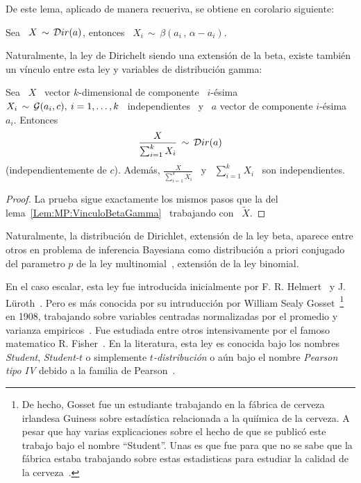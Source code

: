 De este lema, aplicado de manera recueriva, se obtiene en corolario siguiente:
%
\begin{corolario}
\label{Cor:MP:MarginalDirichletBeta}
%
  Sea  \ $X  \,  \sim \,  \mathcal{D}ir(a)$, entonces  \  $\displaystyle X_i  \, \sim  \,
  \beta\left( a_i \, , \, \alpha-a_i \right)$.
\end{corolario}

Naturalmente,  la ley de  Dirichelt siendo  una extensi\'on  de la  beta, existe
tambi\'en un v\'inculo entre esta ley y variables de distribuci\'on gamma:
%
\begin{lema}
\label{Lem:MP:VinculoDirichletGamma}
%
Sea \ $X$ \ vector $k$-dimensional de componente \ $i$-\'esima \ $X_i \, \sim \,
\mathcal{G}(a_i,c), \: i = 1, \ldots , k$ \ independientes \ y \ $a$ vector de componente
$i$-\'esima \ $a_i$. Entonces
  \[
  \frac{X}{\sum_{i=1}^k X_i} \, \sim \, \mathcal{D}ir(a)
  \]
  (independientemente  de $c$).   Adem\'as, $\frac{X}{\sum_{i=1}^k  X_i}$ \  y \
  $\sum_{i=1}^k X_i$ \ son independientes.
\end{lema}
%
\begin{proof}
  La    prueba   sigue    exactamente   los    mismos   pasos    que    la   del
  lema~\ref{Lem:MP:VinculoBetaGamma} \ trabajando con \ $\widetilde{X}$.
\end{proof}

Naturalmente,  la  distribuci\'on de  Dirichlet,  extensi\'on  de  la ley  beta,
aparece entre  otros en problema  de inferencia Bayesiana como  distribuci\'on a
priori  conjugado~\footref{Foot:MP:BayesPrior}  del  parametro  $p$  de  la  ley
multinomial~\cite{Rob07}, extensi\'on de la ley binomial.




\label{Sssec:MP:Student}

En   el  caso   escalar,  esta   ley   fue  introducida   inicialmente  por   F.
R. Helmert~\cite{Hel75, Hel76, She95}  y J.  L\"uroth~\cite{Lur76, Pfa96}.  Pero
es m\'as  conocida por su  intruducci\'on por William  Sealy Gosset~\footnote{De
  hecho,  Gosset  fue  un  estudiante  trabajando en  la  f\'abrica  de  cerveza
  irlandesa  Guiness  sobre estad\'istica  relacionada  a  la  qui\'imica de  la
  cerveza.   A pesar  que hay  varias  explicaciones sobre  el hecho  de que  se
  public\'o este trabajo bajo el nombre ``Student''. Unas es que fue para que no
  se  sabe que  la f\'abrica  estaba  trabajando sobre  estas estadisticas  para
  estudiar la  calidad de la  cerveza~\cite{Wen16}.}  en 1908,  trabajando sobre
variables    centradas    normalizadas    por    el    promedio    y    varianza
empiricos~\cite{Stu08}.  Fue estudiada entre  otros intensivamente por el famoso
matematico R. Fisher~\cite{Fis25}.  En la  literatura, esta ley es conocida bajo
los nombres {\em Student},  {\em Student-$t$} o simplemente {\em $t$-distribuci\'on}
o  a\'un  bajo  el  nombre  {\em  Pearson  tipo  IV}  debido  a  la  familia  de
Pearson~\cite{Pea95}.

